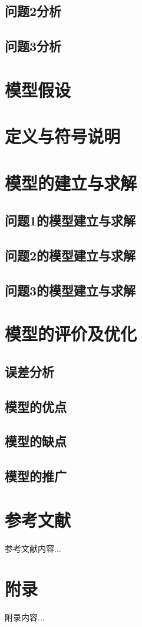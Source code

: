 \documentclass{article}
\begin{document}
	\subsection{问题2分析}
	\subsection{问题3分析}
	\section{模型假设}  
	\section{定义与符号说明}  
	\section{模型的建立与求解}  
	\subsection{问题1的模型建立与求解}  
	\subsection{问题2的模型建立与求解}  
	\subsection{问题3的模型建立与求解}  
	\section{模型的评价及优化}  
	\subsection{误差分析}  
	\subsection{模型的优点}  
	\subsection{模型的缺点}  
	\subsection{模型的推广} 
	\newpage
	\pagestyle{plain}
	\section{参考文献}
	参考文献内容...  
	\newpage %
	\section{附录} 
	附录内容...  
	
	
	
	
\end{document}
